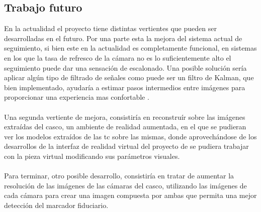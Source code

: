 \subsection{Trabajo futuro}
En la actualidad el proyecto tiene distintas vertientes que pueden ser desarrolladas en el futuro. Por una parte esta la mejora del sistema actual de seguimiento, si bien este en la actualidad es completamente funcional, en sistemas en los que la tasa de refresco de la cámara no es lo suficientemente alto el seguimiento puede dar una sensación de escalonado. Una posible solución sería aplicar algún tipo de filtrado de señales como puede ser un filtro de Kalman, que bien implementado, ayudaría a estimar pasos intermedios entre imágenes para proporcionar una experiencia mas confortable \cite{welch2020kalman}.
\paragraph{}
Una segunda vertiente de mejora, consistiría en reconstruír sobre las imágenes extraídas del casco, un ambiente de realidad aumentada, en el que se pudieran ver los modelos extraídos de las \acrshort{tc} sobre las mismas, donde aprovechándose de los desarrollos de la interfaz de realidad virtual del proyecto de \citeauthor{IglesiasGuitian2022} se pudiera trabajar con la pieza virtual modificando sus parámetros visuales.
\paragraph{}
Para terminar, otro posible desarrollo, consistiría en tratar de aumentar la resolución de las imágenes de las cámaras del casco, utilizando las imágenes de cada cámara para crear una imagen compuesta por ambas que permita una mejor detección del marcador fiduciario.